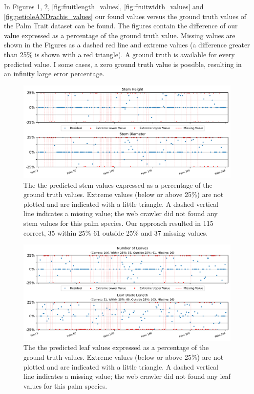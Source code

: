 \documentclass[a4paper, 12pt, oneside]{book} %
\begin{document}
In Figures \ref{fig:stem_values}, \ref{fig:leaf_values}, \ref{fig:fruitlength_values}, \ref{fig:fruitwidth_values} and \ref{fig:petioleANDrachis_values} our found values versus the ground truth values of the Palm Trait dataset can be found.
The figures contain the difference of our value expressed as a percentage of the ground truth value.
Missing values are shown in the Figures as a dashed red line and extreme values (a difference greater than 25\% is shown with a red triangle).
A ground truth is available for every predicted value.
I some cases, a zero ground truth value is possible, resulting in an infinity large error percentage.

\begin{figure}[htpb]
    \centering
    \includegraphics[width=1\textwidth]{figures/stem_values.pdf}
    \caption[Stem values ground truth vs predicted]{The the predicted stem values expressed as a percentage of the ground truth values. Extreme values (below or above 25\%) are not plotted and are indicated with a little triangle. A dashed vertical line indicates a missing value; the web crawler did not found any stem values for this palm species. Our approach resulted in 115 correct, 35 within 25\% 61 outside 25\% and 37 missing values.}
    \label{fig:stem_values}
\end{figure}

\begin{figure}[htpb]
    \centering
    \includegraphics[width=1\textwidth]{figures/leaf_values.pdf}
    \caption[Leaf values ground truth vs predicted]{The the predicted leaf values expressed as a percentage of the ground truth values. Extreme values (below or above 25\%) are not plotted and are indicated with a little triangle. A dashed vertical line indicates a missing value; the web crawler did not found any leaf values for this palm species.}
    \label{fig:leaf_values}
\end{figure}
\end{document}
